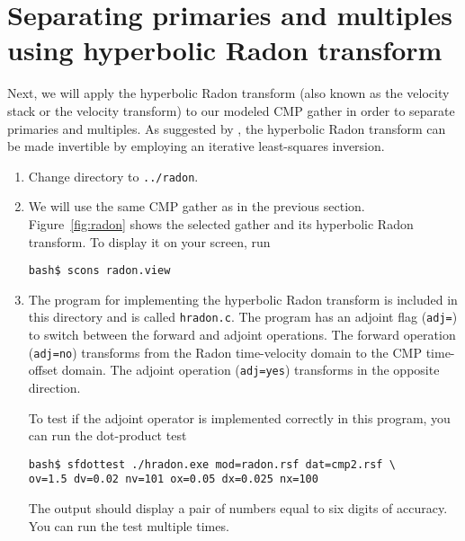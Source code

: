 \lstset{language=python,numbers=left,numberstyle=\tiny,showstringspaces=false}


\section{Separating primaries and multiples using hyperbolic Radon transform}

Next, we will apply the hyperbolic Radon transform (also known as the velocity stack or the velocity transform) to our modeled CMP gather in order to separate primaries and multiples. As suggested by \cite{GEO50-12-27272741}, the hyperbolic Radon transform can be made invertible by employing an iterative least-squares inversion.

\begin{enumerate}

\item Change directory to \texttt{../radon}.


\item We will use the same CMP gather as in the previous section. Figure~\ref{fig:radon} shows the selected gather and its hyperbolic Radon transform. To display it on your screen, run
\begin{verbatim}
bash$ scons radon.view
\end{verbatim}

\item The program for implementing the hyperbolic Radon transform is included in this directory and is called \texttt{hradon.c}. The program has an adjoint flag (\texttt{adj=}) to switch between the forward and adjoint operations. The forward operation (\texttt{adj=no}) transforms from the Radon time-velocity domain to the CMP time-offset domain. The adjoint operation  (\texttt{adj=yes}) transforms in the opposite direction. 

To test if the adjoint operator is implemented correctly in this program, you can run the dot-product test
\begin{verbatim}
bash$ sfdottest ./hradon.exe mod=radon.rsf dat=cmp2.rsf \
ov=1.5 dv=0.02 nv=101 ox=0.05 dx=0.025 nx=100
\end{verbatim}
The output should display a pair of numbers equal to six digits of accuracy. You can run the test multiple times.


\end{enumerate}
